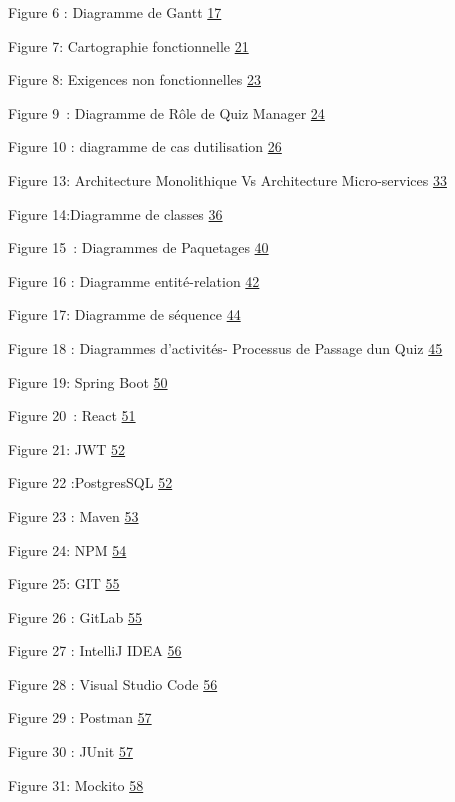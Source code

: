 \documentclass[12pt,a4paper,twoside]{report}
\begin{document}
Figure 6 : Diagramme de Gantt \protect\hyperlink{_Toc203823418}{17}

Figure 7: Cartographie fonctionnelle
\protect\hyperlink{_Toc203823419}{21}

Figure 8: Exigences non fonctionnelles
\protect\hyperlink{_Toc203823420}{23}

Figure 9~: Diagramme de Rôle de Quiz Manager
\protect\hyperlink{_Toc203823421}{24}

Figure 10 : diagramme de cas d\textquotesingle utilisation
\protect\hyperlink{_Toc203823422}{26}

Figure 13: Architecture Monolithique Vs Architecture Micro-services
\protect\hyperlink{_Toc203823423}{33}

Figure 14:Diagramme de classes \protect\hyperlink{_Toc203823424}{36}

Figure 15~: Diagrammes de Paquetages
\protect\hyperlink{_Toc203823425}{40}

Figure 16 : Diagramme entité-relation
\protect\hyperlink{_Toc203823426}{42}

Figure 17: Diagramme de séquence \protect\hyperlink{_Toc203823427}{44}

Figure 18 : Diagrammes d'activités- Processus de Passage
d\textquotesingle un Quiz \protect\hyperlink{_Toc203823428}{45}

Figure 19: Spring Boot \protect\hyperlink{_Toc203823429}{50}

Figure 20~: React \protect\hyperlink{_Toc203823430}{51}

Figure 21: JWT \protect\hyperlink{_Toc203823431}{52}

Figure 22 :PostgresSQL \protect\hyperlink{_Toc203823432}{52}

Figure 23 : Maven \protect\hyperlink{_Toc203823433}{53}

Figure 24: NPM \protect\hyperlink{_Toc203823434}{54}

Figure 25: GIT \protect\hyperlink{_Toc203823435}{55}

Figure 26 : GitLab \protect\hyperlink{_Toc203823436}{55}

Figure 27 : IntelliJ IDEA \protect\hyperlink{_Toc203823437}{56}

Figure 28 : Visual Studio Code \protect\hyperlink{_Toc203823438}{56}

Figure 29 : Postman \protect\hyperlink{_Toc203823439}{57}

Figure 30 : JUnit \protect\hyperlink{_Toc203823440}{57}

Figure 31: Mockito \protect\hyperlink{_Toc203823441}{58}
\end{document}

